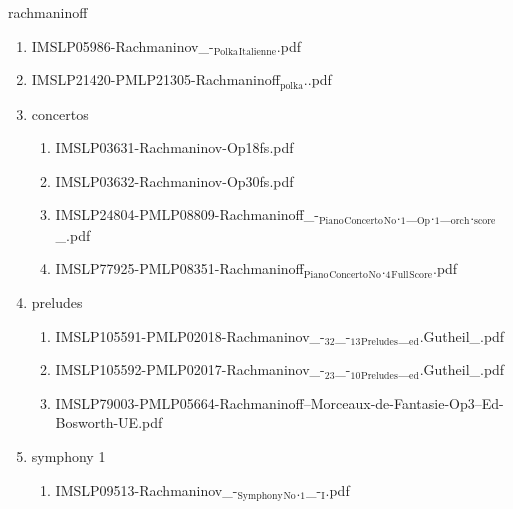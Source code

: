 \documentclass[11pt]{article}
\begin{document}
\item rachmaninoff
\label{sec-1-1-1-1-44-53}
\begin{enumerate}
\item IMSLP05986-Rachmaninov\_-$_{\text{Polka}}$$_{\text{Italienne}}$.pdf
\label{sec-1-1-1-1-44-53-1}

\item IMSLP21420-PMLP21305-Rachmaninoff$_{\text{polka}}$..pdf
\label{sec-1-1-1-1-44-53-2}

\item concertos
\label{sec-1-1-1-1-44-53-3}
\begin{enumerate}
\item IMSLP03631-Rachmaninov-Op18fs.pdf
\label{sec-1-1-1-1-44-53-3-1}

\item IMSLP03632-Rachmaninov-Op30fs.pdf
\label{sec-1-1-1-1-44-53-3-2}

\item IMSLP24804-PMLP08809-Rachmaninoff\_-$_{\text{Piano}}$$_{\text{Concerto}}$$_{\text{No}}$.$_{\text{1}}$\_$_{\text{Op}}$.$_{\text{1}}$\_$_{\text{orch}}$.$_{\text{score}}$\_.pdf
\label{sec-1-1-1-1-44-53-3-3}

\item IMSLP77925-PMLP08351-Rachmaninoff$_{\text{Piano}}$$_{\text{Concerto}}$$_{\text{No}}$.$_{\text{4}}$$_{\text{Full}}$$_{\text{Score}}$.pdf
\label{sec-1-1-1-1-44-53-3-4}
\end{enumerate}

\item preludes
\label{sec-1-1-1-1-44-53-4}
\begin{enumerate}
\item IMSLP105591-PMLP02018-Rachmaninov\_-$_{\text{32}}$\_-$_{\text{13}}$$_{\text{Preludes}}$\_$_{\text{ed}}$.Gutheil\_.pdf
\label{sec-1-1-1-1-44-53-4-1}

\item IMSLP105592-PMLP02017-Rachmaninov\_-$_{\text{23}}$\_-$_{\text{10}}$$_{\text{Preludes}}$\_$_{\text{ed}}$.Gutheil\_.pdf
\label{sec-1-1-1-1-44-53-4-2}

\item IMSLP79003-PMLP05664-Rachmaninoff--Morceaux-de-Fantasie-Op3--Ed-Bosworth-UE.pdf
\label{sec-1-1-1-1-44-53-4-3}
\end{enumerate}

\item symphony 1
\label{sec-1-1-1-1-44-53-5}
\begin{enumerate}
\item IMSLP09513-Rachmaninov\_-$_{\text{Symphony}}$$_{\text{No}}$.$_{\text{1}}$\_-$_{\text{I}}$.pdf
\label{sec-1-1-1-1-44-53-5-1}


\end{enumerate}
\end{enumerate}
\end{document}
